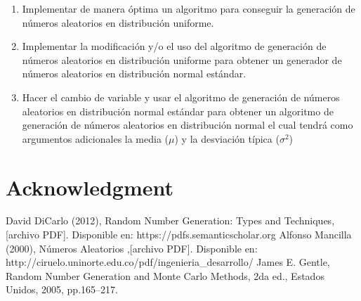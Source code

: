 \documentclass[conference,a4paper]{IEEEtran}
\begin{document}
\begin{enumerate}
    \item Implementar de manera \'optima un algoritmo para conseguir la generaci\'on de n\'umeros aleatorios en distribuci\'on uniforme. 
    \item Implementar la modificaci\'on y/o el uso del algoritmo de generaci\'on de n\'umeros aleatorios en distribuci\'on uniforme para obtener un generador de n\'umeros aleatorios en distribuci\'on normal est\'andar.
    \item Hacer el cambio de variable y usar el algoritmo de generaci\'on de n\'umeros aleatorios en distribuci\'on normal est\'andar para obtener un algoritmo de generaci\'on de n\'umeros aleatorios en distribuci\'on normal el cual tendr\'a como argumentos adicionales la media ($\mu$) y la desviaci\'on t\'ipica ($\sigma^2$)
    
\end{enumerate}

\section*{Acknowledgment}



\begin{thebibliography}{0}
 David DiCarlo (2012), Random Number Generation: Types and Techniques, [archivo PDF]. Disponible en: https://pdfs.semanticscholar.org
 Alfonso Mancilla (2000), N\'umeros Aleatorios ,[archivo PDF]. Disponible en: http://ciruelo.uninorte.edu.co/pdf/ingenieria\_desarrollo/
 James E. Gentle, Random Number Generation and Monte Carlo Methods, 2da ed., Estados Unidos, 2005, pp.165--217.

\end{thebibliography}
\vspace{12pt}
\end{document}
